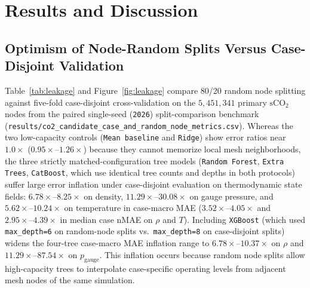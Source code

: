 \documentclass[11pt]{article}
\begin{document}
\section{Results and Discussion}
\subsection{Optimism of Node-Random Splits Versus Case-Disjoint Validation}
Table~\ref{tab:leakage} and Figure~\ref{fig:leakage} compare 80/20 random node splitting against five-fold case-disjoint cross-validation on the $5,451,341$ primary $\mathrm{sCO}_2$ nodes from the paired single-seed (\texttt{2026}) split-comparison benchmark (\texttt{results/co2\_candidate\_case\_and\_random\_node\_metrics.csv}). Whereas the two low-capacity controls (\texttt{Mean baseline} and \texttt{Ridge}) show error ratios near $1.0\times$ ($0.95\times\text{--}1.26\times$) because they cannot memorize local mesh neighborhoods, the three strictly matched-configuration tree models (\texttt{Random Forest}, \texttt{Extra Trees}, \texttt{CatBoost}, which use identical tree counts and depths in both protocols) suffer large error inflation under case-disjoint evaluation on thermodynamic state fields: $6.78\times\text{--}8.25\times$ on density, $11.29\times\text{--}30.08\times$ on gauge pressure, and $5.62\times\text{--}10.24\times$ on temperature in case-macro MAE ($3.52\times\text{--}4.05\times$ and $2.95\times\text{--}4.39\times$ in median case nMAE on $\rho$ and $T$). Including \texttt{XGBoost} (which used \texttt{max\_depth=6} on random-node splits vs.\ \texttt{max\_depth=8} on case-disjoint splits) widens the four-tree case-macro MAE inflation range to $6.78\times\text{--}10.37\times$ on $\rho$ and $11.29\times\text{--}87.54\times$ on $p_{\mathrm{gauge}}$. This inflation occurs because random node splits allow high-capacity trees to interpolate case-specific operating levels from adjacent mesh nodes of the same simulation.
\end{document}
